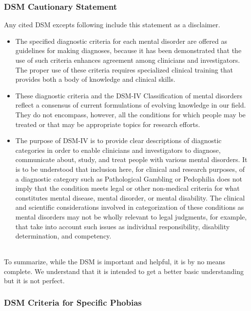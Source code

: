 \documentclass[a4paper,10pt]{article}
\begin{document}
\subsubsection{DSM Cautionary Statement}
Any cited DSM excepts following include this statement as a disclaimer. \cite{dsmCaution}
\begin{itemize}

\item The specified diagnostic criteria for each mental disorder are offered as guidelines for making diagnoses, because it has been demonstrated that the use of such criteria
enhances agreement among clinicians and investigators. The proper use of these criteria requires specialized clinical training that provides both a body of knowledge and clinical skills. 

\item These diagnostic criteria and the DSM-IV Classification of mental disorders reflect a consensus of current formulations of evolving knowledge in our field. They do 
not encompass, however, all the conditions for which people may be treated or that may be appropriate topics for research efforts. 

\item The purpose of DSM-IV is to provide clear descriptions of diagnostic categories in order to enable clinicians and investigators to diagnose, communicate about, study,
and treat people with various mental disorders. It is to be understood that inclusion here, for clinical and research purposes, of a diagnostic category such as Pathological
Gambling or Pedophilia does not imply that the condition meets legal or other non-medical criteria for what constitutes mental disease, mental disorder, or mental disability.
The clinical and scientific considerations involved in categorization of these conditions as mental disorders may not be wholly  relevant to legal judgments, for example, that 
take into account such issues as individual responsibility, disability determination, and competency.
\end{itemize}
\par~\\
To summarize, while the DSM is important and helpful, it is by no means complete.  We understand that it is intended to get a better basic understanding but it is not perfect.  
\par
\subsubsection{DSM Criteria for Specific Phobias}
\end{document}

